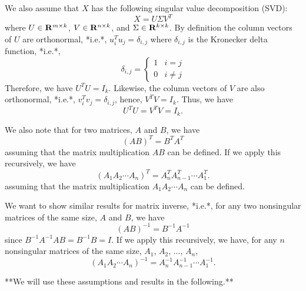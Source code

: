 We also assume that $X$ has the following singular value decomposition (SVD):
\begin{equation}
X = U \Sigma V^T
\end{equation}
where $U\in\mathbf{R}^{m\times k}$, $V\in\mathbf{R}^{n\times k}$, and $\Sigma \in \mathbf{R}^{k \times k}$.
By definition the column vectors of $U$ are orthonormal, *i.e.*, $u_i^T u_j = \delta_{i,j}$ where $\delta_{i,j}$ is the Kronecker delta function, *i.e.*,
\begin{equation}
\delta_{i,j} = \left\{\begin{array}{ll}
1 & i=j\\
0 & i\neq j
\end{array}\right.
\end{equation}
Therefore, we have $U^TU = I_k$. 
Likewise, the column vectors of $V$ are also orthonormal, *i.e.*, $v_i^T v_j = \delta_{i,j}$, hence, $V^TV=I_k$.
Thus, we have
\begin{equation}
U^TU = V^TV = I_k.
\end{equation}

We also note that for two matrices, $A$ and $B$, we have 
\begin{equation}
(AB)^T = B^T A^T
\end{equation}
assuming that the matrix multiplication $AB$ can be defined.
If we apply this recursively, we have
\begin{equation}
(A_1 A_2 \cdots A_n)^{T} = A_n^{T}A_{n-1}^{T}\cdots A_1^{T}.
\end{equation}
assuming that the matrix multiplication $A_1 A_2 \cdots A_n$ can be defined.

We want to show similar results for matrix inverse,
*i.e.*,
for any two nonsingular matrices of the same size, $A$ and $B$, we have
\begin{equation}
(AB)^{-1} = B^{-1}A^{-1}
\end{equation}
since $B^{-1}A^{-1} AB = B^{-1} B = I$.
If we apply this recursively, we have,
for any $n$ nonsingular matrices of the same size, $A_1$, $A_2$, $\ldots$, $A_n$,
\begin{equation}
(A_1 A_2 \cdots A_n)^{-1} = A_n^{-1}A_{n-1}^{-1}\cdots A_1^{-1}.
\end{equation}

**We will use these assumptions and results in the following.**







